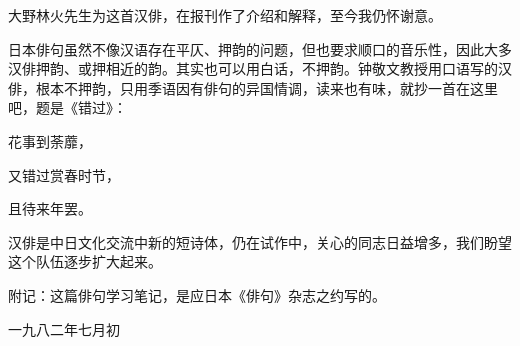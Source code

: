 {  大野林火先生为这首汉俳，在报刊作了介绍和解释，至今我仍怀谢意。

  日本俳句虽然不像汉语存在平仄、押韵的问题，但也要求顺口的音乐性，因此大多汉俳押韵、或押相近的韵。其实也可以用白话，不押韵。钟敬文教授用口语写的汉俳，根本不押韵，只用季语因有俳句的异国情调，读来也有味，就抄一首在这里吧，题是《错过》：

  \begin{center}
      花事到荼蘼，

      又错过赏春时节，

      且待来年罢。
  \end{center}

  汉俳是中日文化交流中新的短诗体，仍在试作中，关心的同志日益增多，我们盼望这个队伍逐步扩大起来。

  \bigskip

  附记：这篇俳句学习笔记，是应日本《俳句》杂志之约写的。

  \hfill 一九八二年七月初
 }

